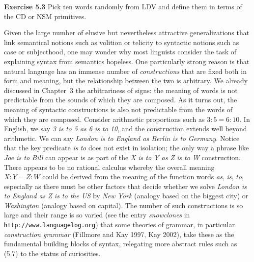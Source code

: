 \smallskip
\noindent
{\bf Exercise 5.3} Pick ten words randomly from LDV and define them in 
terms of the CD or NSM primitives. 

\smallskip \noindent Given the large number of elusive but nevertheless
attractive generalizations that link semantical notions such as volition or
telicity to syntactic notions such as case or subjecthood, one may wonder why
most linguists consider the task of explaining syntax from semantics hopeless.
One particularly strong reason is that natural language has an immense number
of {\it constructions}  that are fixed both in form and
meaning, but the relationship between the two is arbitrary. We already
discussed in Chapter~3 the arbitrariness of signs: the meaning of words is not
predictable from the sounds of which they are composed.  As it turns out, the
meaning of syntactic constructions is also not predictable from the words of
which they are composed.  Consider arithmetic proportions such as
$3:5=6:10$. In English, we say {\it 3 is to 5 as 6 is to 10}, and the
construction extends well beyond arithmetic. We can say {\it London is to
  England as Berlin is to Germany}. Notice that the key predicate {\it is to}
does not exist in isolation; the only way a phrase like {\it Joe is to Bill}
can appear is as part of the {\it X is to Y as Z is to W} construction. There
appears to be no rational calculus whereby the overall meaning $X:Y=Z:W$ could
be derived from the meaning of the function words {\it as}, {\it is}, {\it
  to}, especially as there must be other factors that decide whether we solve
{\it London is to England as Z is to the US} by {\it New York} (analogy based
on the biggest city) or {\it Washington} (analogy based on capital). The
number of such constructions is so large and their range is so varied (see the
entry {\it snowclones} in {\tt http://www.languagelog.org}) that some theories
of grammar, in particular {\it construction grammar} (Fillmore and Kay 1997,
Kay 2002),\nocite{Fillmore:1997}\nocite{Kay:2002} take these as the
fundamental building blocks of syntax, relegating more abstract rules such as
(5.7) to the status of curiosities.  

